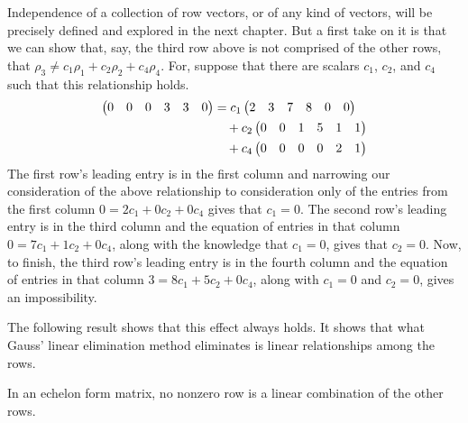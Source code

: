 Independence of a collection of row vectors, or of any kind of vectors, 
will be precisely defined and explored in the next chapter.
But a first take on it is that we can show that, say, the third row above
is not comprised of the other rows, that
$\rho_3\neq c_1\rho_1+c_2\rho_2+c_4\rho_4$.
For, suppose that there are scalars $c_1$, $c_2$, and $c_4$ such that this
relationship holds.
\begin{align*}
  \begin{pmatrix} 0  &0  &0  &3  &3  &0 \end{pmatrix}
  &=c_1\begin{pmatrix} 2 &3 &7 &8 &0 &0 \end{pmatrix}             \\
  &\quad\hbox{}+c_2\begin{pmatrix} 0 &0 &1 &5 &1 &1 \end{pmatrix} \\
  &\quad\hbox{}+c_4\begin{pmatrix} 0 &0 &0 &0 &2 &1 \end{pmatrix}
\end{align*}
The first row's leading entry is in the first column and narrowing our
consideration of the above relationship to consideration only of the entries
from the first column $0=2c_1+0c_2+0c_4$ gives that $c_1=0$.
The second row's leading entry is in the third column and the equation of
entries in that column $0=7c_1+1c_2+0c_4$, along with the knowledge that
$c_1=0$, gives that $c_2=0$.
Now, to finish, the third row's leading entry is in the fourth column and the
equation of entries in that column $3=8c_1+5c_2+0c_4$, along with $c_1=0$ and
$c_2=0$, gives an impossibility.

The following result shows that this effect always holds.
It shows that what Gauss' linear elimination method eliminates is linear
relationships among the rows.

\begin{lemma}      \label{le:EchFormNoLinCombo}
In an echelon form matrix,
no nonzero row is a linear combination of the other rows.
\end{lemma}

